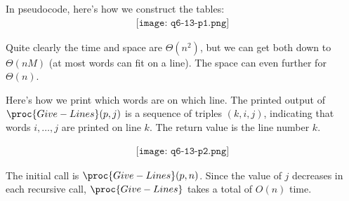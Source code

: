 In pseudocode, here's how we construct the tables:
\begin{align}
\texttt{[image: q6-13-p1.png]}
\end{align}

Quite clearly the time and space are $\Theta(n^2)$, but we can get both down to $\Theta(nM)$ (at most  words can fit on a line). The space can even further for $\Theta(n)$.

Here's how we print which words are on which line. The printed output of $\proc{Give-Lines}(p, j)$ is a sequence of triples $(k, i, j)$, indicating that words $i, \ldots , j$ are printed on line $k$. The return value is the line number $k$.

\begin{align}
\texttt{[image: q6-13-p2.png]}
\end{align}

The initial call is $\proc{Give-Lines}(p, n)$. Since the value of $j$ decreases in each recursive call, $\proc{Give-Lines}$ takes a total of $O(n)$ time.\\[12pt]
